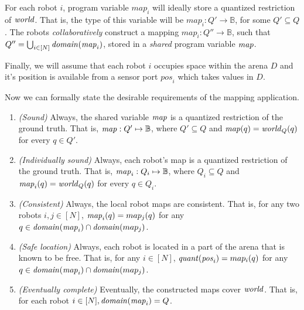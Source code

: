 For each robot $i$,  program variable $\mathit{map}_i$ will ideally store a quantized restriction of $\mathit{world}$. That is, the type of this variable will be $\mathit{map}_i: Q' \rightarrow \mathbb{B}$, for some $Q' \subseteq Q$. The robots \emph{collaboratively} construct a mapping $\mathit{map}_i: Q'' \rightarrow \mathbb{B}$, such that $Q'' = \bigcup_{i\in[N]} \mathit{domain}(\mathit{map}_i)$, stored in a \emph{shared} program variable $\mathit{map}$.


%
Finally, we will assume that each robot $i$ occupies space within the arena $D$ and it's position is available from a sensor port $\mathit{pos}_i$ which takes values in $D$.

Now we can formally state the desirable requirements of the mapping application.
\begin{enumerate}
	\item {\em (Sound)\/} Always, the shared variable $\mathit{map}$ is a quantized restriction of the ground truth. That is, $\mathit{map}: Q' \mapsto\mathbb{B}$, where $Q'\subseteq Q$ and $\mathit{map}(q) = \mathit{world}_Q(q)$ for every $q \in Q'$.
 \item {\em (Individually sound)\/} Always, each robot's map is a quantized restriction of the ground truth. That is, $\mathit{map}_i: Q_i \mapsto \mathbb{B}$, where $Q_i\subseteq Q$ and  $\mathit{map}_i(q) = \mathit{world}_Q(q)$ for every $q\in Q_i$.
	\item {\em (Consistent)\/} Always, the local robot maps are consistent. That is, for any two robots $i,j \in [N]$,  $\mathit{map}_i(q) = map_j(q)$  for any  $q\in \mathit{domain}(\mathit{map}_i) \cap \mathit{domain}(map_j)$.
	\item {\em (Safe location)\/} Always, each robot is located in a part of the arena that is known to be free.
	That is, for any  $i \in [N]$,  $\mathit{quant}(\mathit{pos}_i) = map_i(q)$  for any  $q\in \mathit{domain}(\mathit{map}_i) \cap \mathit{domain}(map_j)$.
	\item {\em (Eventually complete)} Eventually, the constructed maps cover $\mathit{world}$. That is, for each robot $i\in [N], \mathit{domain}(\mathit{map}_i) = Q$.
\end{enumerate}


